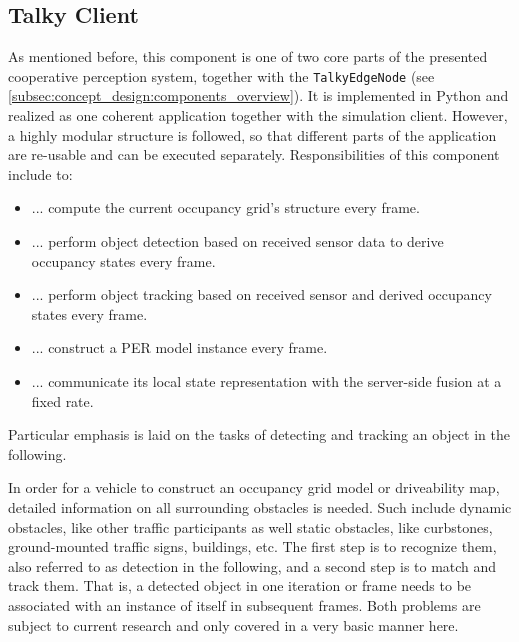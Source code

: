 \subsection{Talky Client}
\label{subsec:implementation:talky_client}
As mentioned before, this component is one of two core parts of the presented cooperative perception system, together with the \texttt{TalkyEdgeNode} (see \cref{subsec:concept_design:components_overview}). It is implemented in Python and realized as one coherent application together with the simulation client. However, a highly modular structure is followed, so that different parts of the application are re-usable and can be executed separately. Responsibilities of this component include to:

\begin{itemize}
	\item ... compute the current occupancy grid's structure every frame.
	\item ... perform object detection based on received sensor data to derive occupancy states every frame.
	\item ... perform object tracking based on received sensor and derived occupancy states every frame.
	\item ... construct a PER model instance every frame.
	\item ... communicate its local state representation with the server-side fusion at a fixed rate.
\end{itemize}

Particular emphasis is laid on the tasks of detecting and tracking an object in the following. 

In order for a vehicle to construct an occupancy grid model or driveability map, detailed information on all surrounding obstacles is needed. Such include dynamic obstacles, like other traffic participants as well static obstacles, like curbstones, ground-mounted traffic signs, buildings, etc. The first step is to recognize them, also referred to as detection in the following, and a second step is to match and track them. That is, a detected object in one iteration or frame needs to be associated with an instance of itself in subsequent frames. Both problems are subject to current research and only covered in a very basic manner here.
\par
\bigskip

